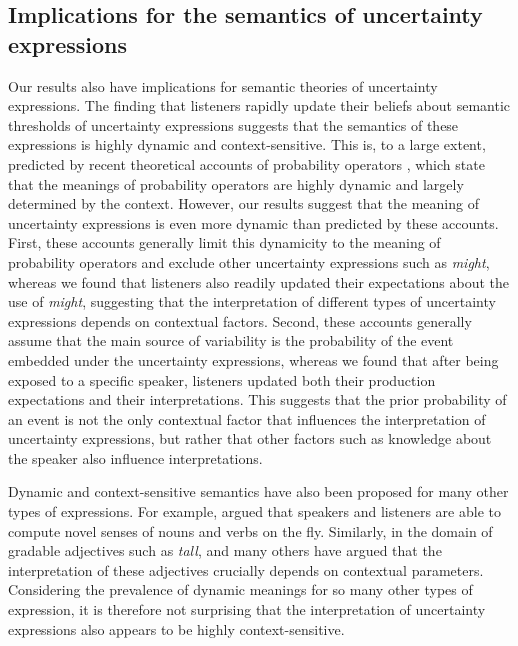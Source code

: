\documentclass[man, floatsintext]{apa6}
\begin{document}


\subsection{Implications for the semantics of uncertainty expressions}

Our results also have implications for semantic theories of uncertainty expressions.
The finding that listeners rapidly update their beliefs about semantic thresholds of uncertainty expressions
suggests that the semantics of these expressions is highly dynamic and context-sensitive. This is, to a large extent, predicted by recent 
theoretical accounts of probability operators \parencite[a subset of uncertainty expressions, e.g.,][]{Yalcin2010,Lassiter2015,Lassiter2016}, which 
state that the meanings of probability operators are highly dynamic and largely determined by the context. However, our results
suggest that the meaning of uncertainty expressions is even more dynamic than predicted by these accounts. First, these accounts
generally limit this dynamicity to the meaning of probability operators and exclude other uncertainty expressions such as \textit{might},
whereas we found that listeners also readily updated their expectations about the use of \textit{might}, suggesting that the interpretation of different types of
uncertainty expressions depends on contextual factors. Second, these accounts generally assume that the main source of variability is the probability of the event
embedded under the uncertainty expressions, whereas we found that after being exposed to a specific speaker, listeners updated both their production expectations and their interpretations.
This suggests that the prior probability of an event is not the only contextual factor that influences the interpretation of uncertainty expressions,
but rather that other factors such as knowledge about the speaker also influence interpretations.

Dynamic and context-sensitive semantics have also been proposed for many other types of expressions.
For example, \textcite{Clark1983} argued that speakers and listeners
are able to compute novel senses of nouns and verbs on the fly. Similarly, in the domain of gradable adjectives such as \textit{tall},
 \textcite{Kennedy2007} and many others have argued that the interpretation of these adjectives crucially depends on contextual
 parameters. Considering the prevalence of dynamic meanings for so many other types of expression, it is therefore not 
 surprising that the interpretation of uncertainty expressions also appears to be highly context-sensitive.
 
\end{document}
